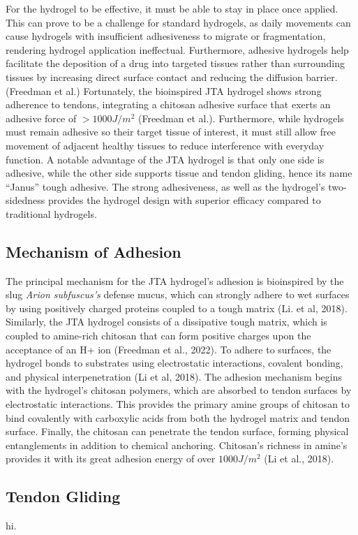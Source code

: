 For the hydrogel to be effective, it must be able to stay in place once applied. This can prove to be a challenge for standard hydrogels, as daily movements can cause hydrogels with insufficient adhesiveness to migrate or fragmentation, rendering hydrogel application ineffectual. Furthermore, adhesive hydrogels help facilitate the deposition of a drug into targeted tissues rather than surrounding tissues by increasing direct surface contact and reducing the diffusion barrier. (Freedman et al.) Fortunately, the bioinspired JTA hydrogel shows strong adherence to tendons, integrating a chitosan adhesive surface that exerts an adhesive force of $>1000J/m^2$ (Freedman et al.). Furthermore, while hydrogels must remain adhesive so their target tissue of interest, it must still allow free movement of adjacent healthy tissues to reduce interference with everyday function. A notable advantage of the JTA hydrogel is that only one side is adhesive, while the other side supports tissue and tendon gliding, hence its name “Janus” tough adhesive. The strong adhesiveness, as well as the hydrogel’s two-sidedness provides the hydrogel design with superior efficacy compared to traditional hydrogels.

\subsection{Mechanism of Adhesion}
The principal mechanism for the JTA hydrogel’s adhesion is bioinspired by the slug \textit{Arion subfuscus’s} defense mucus, which can strongly adhere to wet surfaces by using positively charged proteins coupled to a tough matrix (Li. et al, 2018). Similarly, the JTA hydrogel consists of a dissipative tough matrix, which is coupled to amine-rich chitosan that can form positive charges upon the acceptance of an H+ ion (Freedman et al., 2022). 
To adhere to surfaces, the hydrogel bonds to substrates using electrostatic interactions, covalent bonding, and physical interpenetration (Li et al, 2018). The adhesion mechanism begins with the hydrogel’s chitosan polymers, which are absorbed to tendon surfaces by electrostatic interactions. This provides the primary amine groups of chitosan to bind covalently with carboxylic acids from both the hydrogel matrix and tendon surface. Finally, the chitosan can penetrate the tendon surface, forming physical entanglements in addition to chemical anchoring. Chitosan’s richness in amine’s provides it with its great adhesion energy of over $1000J/m^2$ (Li et al., 2018).

\subsection{Tendon Gliding}
hi.
